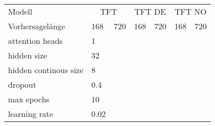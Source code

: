 \begin{tabular}{
    l
    l
    l
    l
    l
    l
    l
}
    \toprule
    {Modell} & \multicolumn{2}{c}{TFT} & \multicolumn{2}{c}{TFT DE} & \multicolumn{2}{c}{TFT NO} \\
    \cmidrule(lr){2-3} \cmidrule(lr){4-5} \cmidrule(lr){6-7}
    Vorhersagelänge & {168} & {720} & {168} & {720} & {168} & {720} \\
    \midrule
    attention heads & 1 & & & & &\\
    hidden size & 32 & & & & & \\
    hidden continous size & 8 & & & & & \\
    dropout & 0.4 & & & & & \\
    max epochs & 10 & & & & & \\
    learning rate & 0.02 & & & & & \\
\end{tabular}


